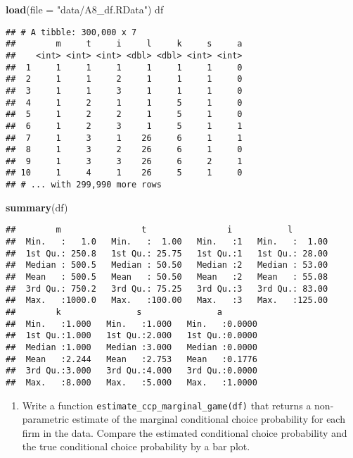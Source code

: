 \documentclass[
]{book}
\newenvironment{Shaded}{\begin{snugshade}}{\end{snugshade}}
\newcommand{\DataTypeTok}[1]{\textcolor[rgb]{0.13,0.29,0.53}{#1}}
\newcommand{\KeywordTok}[1]{\textcolor[rgb]{0.13,0.29,0.53}{\textbf{#1}}}
\newcommand{\NormalTok}[1]{#1}
\newcommand{\StringTok}[1]{\textcolor[rgb]{0.31,0.60,0.02}{#1}}
\providecommand{\tightlist}{%
  \setlength{\itemsep}{0pt}\setlength{\parskip}{0pt}}
\begin{document}
\begin{Shaded}
\begin{Highlighting}[]
\KeywordTok{load}\NormalTok{(}\DataTypeTok{file =} \StringTok{"data/A8_df.RData"}\NormalTok{)}
\NormalTok{df}
\end{Highlighting}
\end{Shaded}

\begin{verbatim}
## # A tibble: 300,000 x 7
##        m     t     i     l     k     s     a
##    <int> <int> <int> <dbl> <dbl> <int> <int>
##  1     1     1     1     1     1     1     0
##  2     1     1     2     1     1     1     0
##  3     1     1     3     1     1     1     0
##  4     1     2     1     1     5     1     0
##  5     1     2     2     1     5     1     0
##  6     1     2     3     1     5     1     1
##  7     1     3     1    26     6     1     1
##  8     1     3     2    26     6     1     0
##  9     1     3     3    26     6     2     1
## 10     1     4     1    26     5     1     0
## # ... with 299,990 more rows
\end{verbatim}

\begin{Shaded}
\begin{Highlighting}[]
\KeywordTok{summary}\NormalTok{(df)}
\end{Highlighting}
\end{Shaded}

\begin{verbatim}
##        m                t                i           l         
##  Min.   :   1.0   Min.   :  1.00   Min.   :1   Min.   :  1.00  
##  1st Qu.: 250.8   1st Qu.: 25.75   1st Qu.:1   1st Qu.: 28.00  
##  Median : 500.5   Median : 50.50   Median :2   Median : 53.00  
##  Mean   : 500.5   Mean   : 50.50   Mean   :2   Mean   : 55.08  
##  3rd Qu.: 750.2   3rd Qu.: 75.25   3rd Qu.:3   3rd Qu.: 83.00  
##  Max.   :1000.0   Max.   :100.00   Max.   :3   Max.   :125.00  
##        k               s               a         
##  Min.   :1.000   Min.   :1.000   Min.   :0.0000  
##  1st Qu.:1.000   1st Qu.:2.000   1st Qu.:0.0000  
##  Median :1.000   Median :3.000   Median :0.0000  
##  Mean   :2.244   Mean   :2.753   Mean   :0.1776  
##  3rd Qu.:3.000   3rd Qu.:4.000   3rd Qu.:0.0000  
##  Max.   :8.000   Max.   :5.000   Max.   :1.0000
\end{verbatim}

\begin{enumerate}
\def\labelenumi{\arabic{enumi}.}
\setcounter{enumi}{13}
\tightlist
\item
  Write a function \texttt{estimate\_ccp\_marginal\_game(df)} that returns a non-parametric estimate of the marginal conditional choice probability for each firm in the data. Compare the estimated conditional choice probability and the true conditional choice probability by a bar plot.
\end{enumerate}
\end{document}
